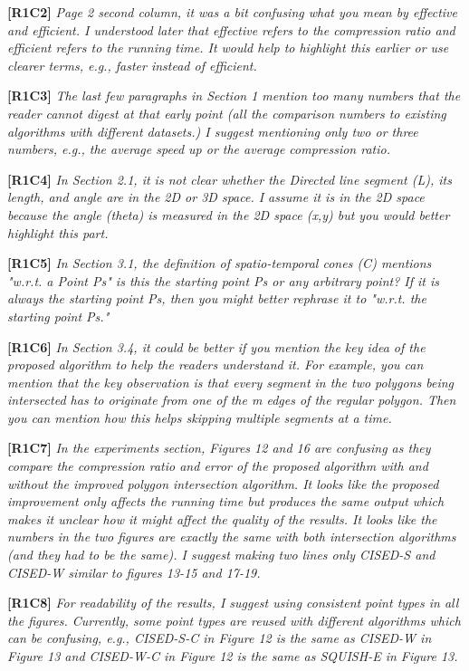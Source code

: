 \documentclass{letter}
\begin{document}
\textbf{[R1C2]} \emph{Page 2 second column, it was a bit confusing what you mean by effective and efficient. I understood later that effective refers to the compression ratio and efficient refers to the running time. It would help to highlight this earlier or use clearer terms, e.g., faster instead of efficient.}

\textbf{[R1C3]} \emph{The last few paragraphs in Section 1 mention too many numbers that the reader cannot digest at that early point (all the comparison numbers to existing algorithms with different datasets.) I suggest mentioning only two or three numbers, e.g., the average speed up or the average compression ratio.}

\textbf{[R1C4]} \emph{In Section 2.1, it is not clear whether the Directed line segment (L), its length, and angle are in the 2D or 3D space. I assume it is in the 2D space because the angle (theta) is measured in the 2D space (x,y) but you would better highlight this part.}

\textbf{[R1C5]} \emph{In Section 3.1, the definition of spatio-temporal cones (C) mentions "w.r.t. a Point Ps" is this the starting point Ps or any arbitrary point? If it is always the starting point Ps, then you might better rephrase it to "w.r.t. the starting point Ps."}

\textbf{[R1C6]} \emph{In Section 3.4, it could be better if you mention the key idea of the proposed algorithm to help the readers understand it. For example, you can mention that the key observation is that every segment in the two polygons being intersected has to originate from one of the m edges of the regular polygon. Then you can mention how this helps skipping multiple segments at a time.}

\textbf{[R1C7]} \emph{In the experiments section, Figures 12 and 16 are confusing as they compare the compression ratio and error of the proposed algorithm with and without the improved polygon intersection algorithm. It looks like the proposed improvement only affects the running time but produces the same output which makes it unclear how it might affect the quality of the results. It looks like the numbers in the two figures are exactly the same with both intersection algorithms (and they had to be the same). I suggest making two lines only CISED-S and CISED-W similar to figures 13-15 and 17-19.}

\textbf{[R1C8]} \emph{For readability of the results, I suggest using consistent point types in all the figures. Currently, some point types are reused with different algorithms which can be confusing, e.g., CISED-S-C in Figure 12 is the same as CISED-W in Figure 13 and CISED-W-C in Figure 12 is the same as SQUISH-E in Figure 13.}
\end{document}
